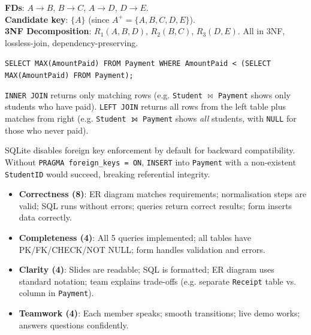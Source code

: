 \documentclass[11pt]{article}
\begin{document}
\begin{corrige}[Exercise 2]
\textbf{FDs}: $A \rightarrow B$, $B \rightarrow C$, $A \rightarrow D$, $D \rightarrow E$.\\
\textbf{Candidate key}: $\{A\}$ (since $A^+ = \{A,B,C,D,E\}$).\\
\textbf{3NF Decomposition}: $R_1(A,B,D)$, $R_2(B,C)$, $R_3(D,E)$. All in 3NF, lossless-join, dependency-preserving.
\end{corrige}

\begin{corrige}[Exercise 3]
\texttt{SELECT MAX(AmountPaid) FROM Payment WHERE AmountPaid < (SELECT MAX(AmountPaid) FROM Payment);}
\end{corrige}

\begin{corrige}[Exercise 4]
\texttt{INNER JOIN} returns only matching rows (e.g. \texttt{Student} $\bowtie$ \texttt{Payment} shows only students who have paid). \texttt{LEFT JOIN} returns all rows from the left table plus matches from right (e.g. \texttt{Student} $\leftouterjoin$ \texttt{Payment} shows \emph{all} students, with \texttt{NULL} for those who never paid).
\end{corrige}

\begin{corrige}[Exercise 5]
SQLite disables foreign key enforcement by default for backward compatibility. Without \texttt{PRAGMA foreign\_keys = ON}, \texttt{INSERT} into \texttt{Payment} with a non-existent \texttt{StudentID} would succeed, breaking referential integrity.
\end{corrige}

\begin{aretenir}
\begin{itemize}
    \item \textbf{Correctness (8)}: ER diagram matches requirements; normalisation steps are valid; SQL runs without errors; queries return correct results; form inserts data correctly.
    \item \textbf{Completeness (4)}: All 5 queries implemented; all tables have PK/FK/CHECK/NOT NULL; form handles validation and errors.
    \item \textbf{Clarity (4)}: Slides are readable; SQL is formatted; ER diagram uses standard notation; team explains trade-offs (e.g. separate \texttt{Receipt} table vs. column in \texttt{Payment}).
    \item \textbf{Teamwork (4)}: Each member speaks; smooth transitions; live demo works; answers questions confidently.
\end{itemize}
\end{aretenir}
\end{document}
